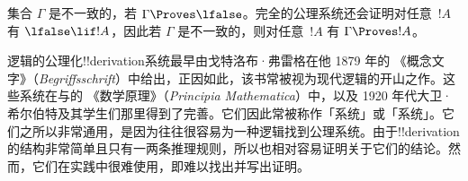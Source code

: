 \documentclass[../../../include/open-logic-section]{subfiles}
\begin{document}
集合 $\Gamma$ 是不一致的，若 $\Gamma \Proves \lfalse$。完全的公理系统还会证明对任意~$!A$ 有 $\lfalse \lif !A$，因此若 $\Gamma$ 是不一致的，则对任意~$!A$ 有 $\Gamma \Proves !A$。

逻辑的公理化!!{derivation}系统最早由戈特洛布·弗雷格在他 1879 年的 《概念文字》（\textit{Begriffsschrift}）中给出，正因如此，该书常被视为现代逻辑的开山之作。这些系统在与的 《数学原理》（\textit{Principia Mathematica}）中，以及 1920 年代大卫·希尔伯特及其学生们那里得到了完善。它们因此常被称作「系统」或「系统」。它们之所以非常通用，是因为往往很容易为一种逻辑找到公理系统。由于!!{derivation}的结构非常简单且只有一两条推理规则，所以也相对容易证明关于它们的结论。然而，它们在实践中很难使用，即难以找出并写出证明。
\end{document}
